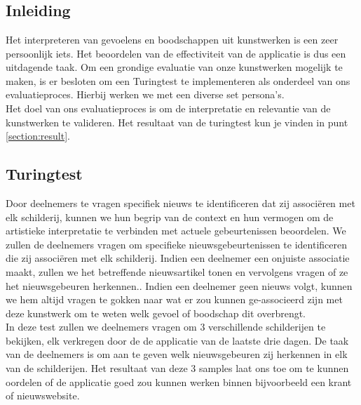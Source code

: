 \chapter{}%
\label{ch:evaluatieproces}
\section{Inleiding}
Het interpreteren van gevoelens en boodschappen uit kunstwerken is een zeer persoonlijk iets. Het beoordelen van de effectiviteit van de applicatie is dus een uitdagende taak. Om een grondige evaluatie van onze kunstwerken mogelijk te maken, is er besloten om een Turingtest te implementeren als onderdeel van ons evaluatieproces. Hierbij werken we met een diverse set persona's. \\

Het doel van ons evaluatieproces is om de interpretatie en relevantie van de kunstwerken te valideren. Het resultaat van de turingtest kun je vinden in punt \ref{section:result}.

\section{Turingtest}
\label{sec:turingtest}
 Door deelnemers te vragen specifiek nieuws te identificeren dat zij associëren met elk schilderij, kunnen we hun begrip van de context en hun vermogen om de artistieke interpretatie te verbinden met actuele gebeurtenissen beoordelen. We zullen de deelnemers vragen om specifieke nieuwsgebeurtenissen te identificeren die zij associëren met elk schilderij.  Indien een deelnemer een onjuiste associatie maakt, zullen we het betreffende nieuwsartikel tonen en vervolgens vragen of ze het nieuwsgebeuren herkennen.. Indien een deelnemer geen nieuws volgt, kunnen we hem altijd vragen te gokken naar wat er zou kunnen ge-associeerd zijn met deze kunstwerk om te weten welk gevoel of boodschap dit overbrengt. \\
 
 In deze test zullen we deelnemers vragen om 3 verschillende schilderijen te bekijken, elk verkregen door de de applicatie van de laatste drie dagen. De taak van de deelnemers is om aan te geven welk nieuwsgebeuren zij herkennen in elk van de schilderijen. Het resultaat van deze 3 samples laat ons toe om te kunnen oordelen of de applicatie goed zou kunnen werken binnen bijvoorbeeld een krant of nieuwswebsite.  \\
 
